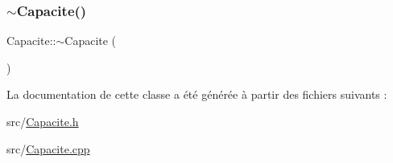 \mbox{\label{class_capacite_a2224d62c03a73b7b34c0a5cb68c91279}} 
\subsubsection{\texorpdfstring{$\sim$\+Capacite()}{~Capacite()}}
{\footnotesize\ttfamily Capacite\+::$\sim$\+Capacite (\begin{DoxyParamCaption}{ }\end{DoxyParamCaption})}



La documentation de cette classe a été générée à partir des fichiers suivants \+:\begin{DoxyCompactItemize}
\item 
src/\hyperlink{_capacite_8h}{Capacite.\+h}\item 
src/\hyperlink{_capacite_8cpp}{Capacite.\+cpp}\end{DoxyCompactItemize}

